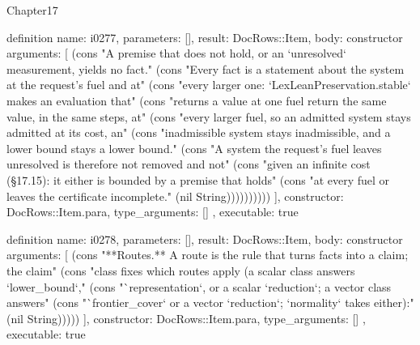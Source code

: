 \begin{lexlean}{Chapter17}
\begin{semanticmodule}
definition{
  name: i0277,
  parameters: [],
  result: DocRows::Item,
  body: constructor{
    arguments: [
      (cons "A premise that does not hold, or an `unresolved` measurement, yields no fact." (cons "Every fact is a statement about the system at the request's fuel and at" (cons "every larger one: `LexLeanPreservation.stable` makes an evaluation that" (cons "returns a value at one fuel return the same value, in the same steps, at" (cons "every larger fuel, so an admitted system stays admitted at its cost, an" (cons "inadmissible system stays inadmissible, and a lower bound stays a lower bound." (cons "A system the request's fuel leaves unresolved is therefore not removed and not" (cons "given an infinite cost (§17.15): it either is bounded by a premise that holds" (cons "at every fuel or leaves the certificate incomplete." (nil String))))))))))
    ],
    constructor: DocRows::Item.para,
    type_arguments: []
  },
  executable: true
}

definition{
  name: i0278,
  parameters: [],
  result: DocRows::Item,
  body: constructor{
    arguments: [
      (cons "**Routes.** A route is the rule that turns facts into a claim; the claim" (cons "class fixes which routes apply (a scalar class answers `lower_bound`," (cons "`representation`, or a scalar `reduction`; a vector class answers" (cons "`frontier_cover` or a vector `reduction`; `normality` takes either):" (nil String)))))
    ],
    constructor: DocRows::Item.para,
    type_arguments: []
  },
  executable: true
}


\end{semanticmodule}
\end{lexlean}
